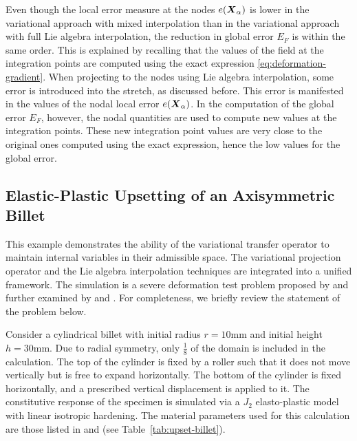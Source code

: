 \documentclass[12pt]{article}
\begin{document}
Even though the local error measure at the nodes $e({\boldsymbol{X}}_{\alpha})$ is
lower in the variational approach with mixed interpolation than in the
variational approach with full Lie algebra interpolation, the
reduction in global error $E_{F}$ is within the same order. This is
explained by recalling that the values of the field at the integration
points are computed using the exact expression
\eqref{eq:deformation-gradient}. When projecting to the nodes using
Lie algebra interpolation, some error is introduced into the stretch,
as discussed before. This error is manifested in the values of the
nodal local error $e({\boldsymbol{X}}_{\alpha})$. In the computation of the global
error $E_F$, however, the nodal quantities are used to compute new
values at the integration points. These new integration point values
are very close to the original ones computed using the exact
expression, hence the low values for the global error.


\subsection{Elastic-Plastic Upsetting of an Axisymmetric Billet}

This example demonstrates the ability of the variational transfer operator to
maintain internal variables in their admissible space. The variational
projection operator and the Lie algebra interpolation techniques are integrated
into a unified framework. The simulation is a severe deformation test problem
proposed by \citet{Krieg.Krieg:1977} and further examined by
\citet{Taylor.Becker:1983} and \citet{Simo.Hughes:1998}. For completeness, we
briefly review the statement of the problem below.

Consider a cylindrical billet with initial radius $r = 10\text{mm}$
and initial height $h = 30\text{mm}$. Due to radial symmetry, only
$\frac{1}{8}$ of the domain is included in the calculation. The top of
the cylinder is fixed by a roller such that it does not move
vertically but is free to expand horizontally. The bottom of the
cylinder is fixed horizontally, and a prescribed vertical displacement
is applied to it.  The constitutive response of the specimen is
simulated via a $J_2$ elasto-plastic model with linear isotropic
hardening. The material parameters used for this calculation are those
listed in \citet{Taylor.Becker:1983} and \citet{Simo.Hughes:1998} (see
Table~\ref{tab:upset-billet}).
\end{document}
